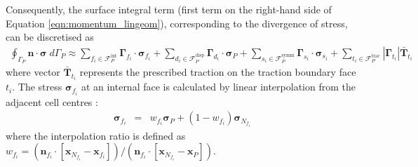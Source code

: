 \documentclass[sn-mathphys,Numbered]{sn-jnl}%
\newcommand{\bb}{\boldsymbol}
\begin{document}
Consequently, the surface integral term (first term on the right-hand side of Equation \ref{eqn:momentum_lingeom}), corresponding to the divergence of stress, can be discretised as
\begin{eqnarray} \label{eq:divStressDiscret}
	\oint_{\Gamma_P} \bb{n} \cdot \bb{\sigma}  \; d\Gamma_P
	\approx 
	\sum_{f_i \in \mathcal{F}_P^{\text{int}}} \bb{\Gamma}_{f_i} \cdot \bb{\sigma}_{f_i}
	+ \sum_{d_i \in \mathcal{F}_P^{\text{disp}}} \bb{\Gamma}_{d_i} \cdot \bb{\sigma}_{P}
	+ \sum_{s_i \in \mathcal{F}_P^{\text{symm}}} \bb{\Gamma}_{s_i} \cdot \bb{\sigma}_{s_i}
	+ \sum_{t_i \in \mathcal{F}_P^{\text{trac}}} |\bb{\Gamma}_{t_i}| \bar{\bb{T}}_{t_i}
\end{eqnarray}
where vector $\bar{\bb{T}}_{t_i}$ represents the prescribed traction on the traction boundary face $t_i$.
The stress $\bb{\sigma}_{f_i}$ at an internal face is calculated by linear interpolation from the adjacent cell centres \citep{Jasak1996}:
\begin{eqnarray} \label{eq:stressInterp}
	\bb{\sigma}_{f_i} &=& w_{f_i} \bb{\sigma}_P + (1 - w_{f_i}) \bb{\sigma}_{N_{f_i}}
\end{eqnarray}
where the interpolation ratio is defined as $w_{f_i} = (\bb{n}_{f_i} \cdot [\bb{x}_{N_{f_i}} - \bb{x}_{f_i}])/(\bb{n}_{f_i} \cdot [\bb{x}_{N_{f_i}} - \bb{x}_{P} ])$.
\end{document}
